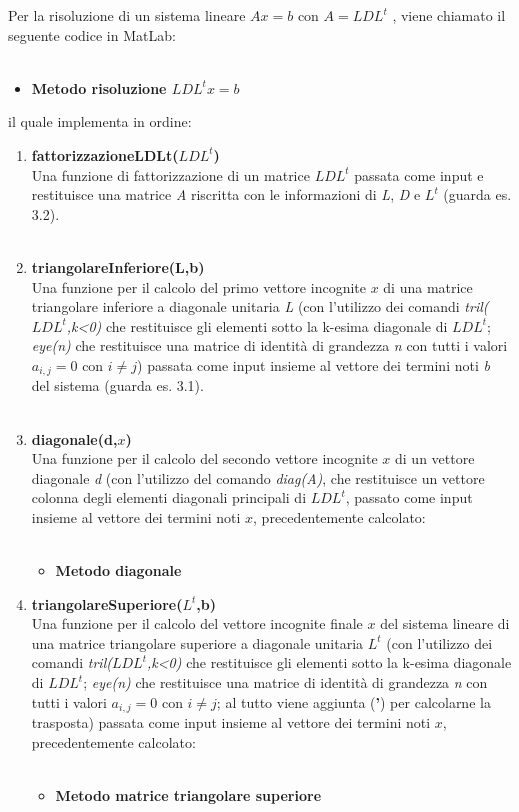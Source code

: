Per la risoluzione di un sistema lineare $Ax=b$ con $A=LDL^t$ , viene chiamato il seguente codice in MatLab:\\\
\begin{itemize}
	\item \textbf{Metodo risoluzione $LDL^tx=b$}
		
\end{itemize}
il quale implementa in ordine:
\begin{enumerate}
	\item \textbf{fattorizzazioneLDLt($LDL^t$)}\\
		Una funzione di fattorizzazione di un matrice $LDL^t$ passata come input e restituisce una matrice \textit{A} riscritta con le informazioni di \textit{L}, \textit{D} e $L^t$ (guarda es. 3.2).\\\
	\item \textbf{triangolareInferiore(L,b)}\\
		Una funzione per il calcolo del primo vettore incognite $x$ di una matrice triangolare inferiore a diagonale unitaria \textit{L} (con l'utilizzo dei comandi \textit{tril($LDL^t$,k<0)} che restituisce gli elementi sotto la k-esima diagonale di $LDL^t$; \textit{eye(n)} che restituisce una matrice di identità di grandezza \textit{n} con tutti i valori $a_{i,j}=0$ con $i \neq j$) passata come input insieme al vettore dei termini noti \textit{b} del sistema (guarda es. 3.1). \\\
	\item \textbf{diagonale(d,$x$)}\\
		Una funzione per il calcolo del secondo vettore incognite $x$ di un vettore diagonale \textit{d} (con l'utilizzo del comando \textit{diag(A)}, che restituisce un vettore colonna degli elementi diagonali principali di $LDL^t$, passato come input insieme al vettore dei termini noti $x$, precedentemente calcolato:\\\
\begin{itemize}
	\item \textbf{Metodo diagonale}
		
\end{itemize}
	\item \textbf{triangolareSuperiore($L^t$,b)}\\
		Una funzione per il calcolo del vettore incognite finale $x$ del sistema lineare di una matrice triangolare superiore a diagonale unitaria \textit{$L^t$} (con l'utilizzo dei comandi \textit{tril($LDL^t$,k<0)} che restituisce gli elementi sotto la k-esima diagonale di $LDL^t$; \textit{eye(n)} che restituisce una matrice di identità di grandezza \textit{n} con tutti i valori $a_{i,j}=0$ con $i \neq j$; al tutto viene aggiunta (\textbf{'}) per calcolarne la trasposta) passata come input insieme al vettore dei termini noti $x$, precedentemente calcolato:\\\
\begin{itemize}
	\item \textbf{Metodo matrice triangolare superiore}
		
\end{itemize}
\end{enumerate}